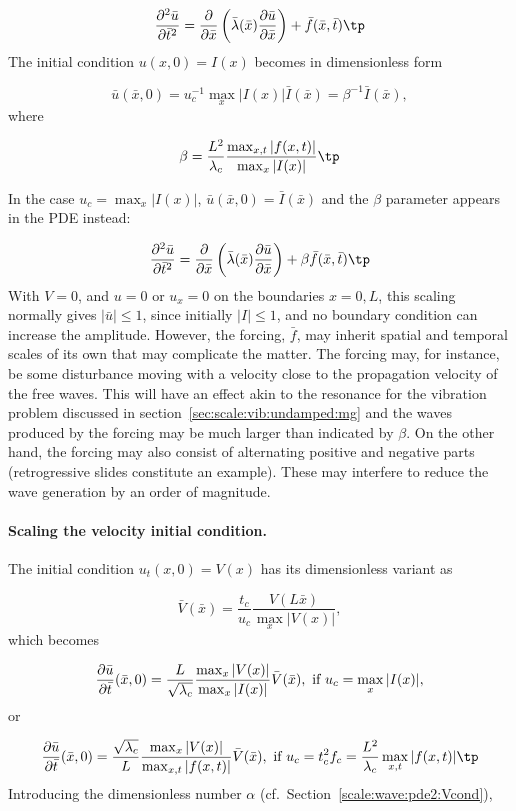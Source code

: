 \documentclass[graybox,envcountchap,sectrefs,final]{svmonodo}
\begin{document}
\[
\frac{\partial^2 \bar u}{\partial \bar t^2} =
\frac{\partial}{\partial \bar x}\left(
\bar\lambda(\bar x) {\partial\bar u\over\partial\bar x}\right)
+ \bar f(\bar x,\bar t)\tp
\]
The initial condition $u(x,0)=I(x)$ becomes in dimensionless form

\[ \bar u(\bar x, 0) = u_c^{-1} \max_x |I(x)|\bar I(\bar x) =
\beta^{-1}\bar I(\bar x),\]
where

\[ \beta = \frac{L^2}{\lambda_c}\frac{\max_{x,t} |f(x,t)|}{\max_x|I(x)|}\tp\]

In the case $u_c=\max_x|I(x)|$, $\bar u(\bar x,0)=\bar I(\bar x)$ and
the $\beta$ parameter appears in the PDE instead:

\[
\frac{\partial^2 \bar u}{\partial \bar t^2} =
\frac{\partial}{\partial \bar x}\left(
\bar\lambda(\bar x) {\partial\bar u\over\partial\bar x}\right)
+ \beta \bar f(\bar x,\bar t)\tp
\]
With $V=0$, and $u=0$ or $u_x=0$ on the boundaries $x=0,L$, this scaling normally gives
$|\bar u|\leq 1$, since initially $|I|\leq 1$, and no boundary condition
can increase the amplitude.
However, the forcing, $\bar f$, may inherit spatial and temporal scales of its
own that may complicate the matter. The forcing may, for instance, be
some disturbance moving with a velocity close to the propagation velocity of
the free waves. This will have an effect akin to the resonance for the vibration problem discussed in
section~\ref{sec:scale:vib:undamped:mg} and the waves produced by the forcing may be much larger than
indicated by $\beta$. On the other hand, the forcing may also consist
of alternating positive and negative parts (retrogressive slides constitute an
example). These may interfere to
reduce the wave generation by an order of magnitude.

\paragraph{Scaling the velocity initial condition.}
The initial condition $u_t(x,0)=V(x)$ has its dimensionless variant as

\[ \bar V(\bar x) = \frac{t_c}{u_c}\frac{V(L\bar x)}{\max_x|V(x)|},\]
which becomes

\[ \frac{\partial\bar u}{\partial\bar t}(\bar x, 0) =
\frac{L}{\sqrt{\lambda_c}}\frac{\max_{x}|V(x)|}{\max_{x}|I(x)|}\bar V(\bar x),
\hbox{ if } u_c=\max_x|I(x)|,\]
or

\[ \frac{\partial\bar u}{\partial\bar t}(\bar x, 0) =
\frac{\sqrt{\lambda_c}}{L}\frac{\max_{x}|V(x)|}{\max_{x,t}|f(x,t)|}
\bar V(\bar x),
\hbox{ if } u_c=t_c^2f_c=\frac{L^2}{\lambda_c}\max_{x,t}|f(x,t)|\tp\]
Introducing the dimensionless number $\alpha$ (cf.~Section~\ref{scale:wave:pde2:Vcond}),
\end{document}

